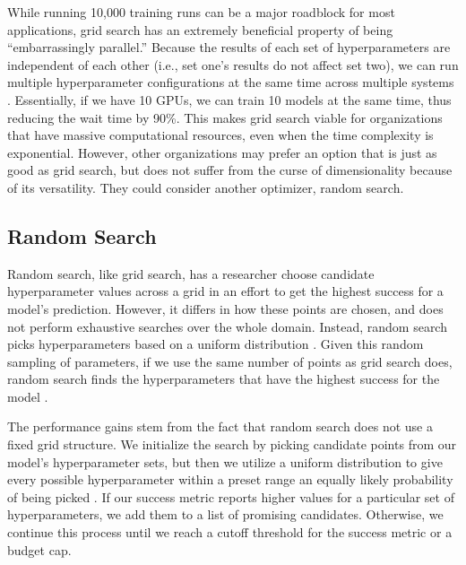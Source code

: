 \documentclass[stu,12pt,floatsintext]{apa7}
\begin{document}
While running 10,000 training runs can be a major roadblock for most applications, grid search has an extremely beneficial property of being ``embarrassingly parallel.'' Because the results of each set of hyperparameters are independent of each other (i.e., set one's results do not affect set two), we can run multiple hyperparameter configurations at the same time across multiple systems \parencite{bergstra2012random}. Essentially, if we have 10 GPUs, we can train 10 models at the same time, thus reducing the wait time by 90\%. This makes grid search viable for organizations that have massive computational resources, even when the time complexity is exponential. However, other organizations may prefer an option that is just as good as grid search, but does not suffer from the curse of dimensionality because of its versatility. They could consider another optimizer, random search. 

\subsection{Random Search}

Random search, like grid search, has a researcher choose candidate hyperparameter values across a grid in an effort to get the highest success for a model's prediction. However, it differs in how these points are chosen, and does not perform exhaustive searches over the whole domain. Instead, random search picks hyperparameters based on a uniform distribution \parencite{pilario2020kernel}. Given this random sampling of parameters, if we use the same number of points as grid search does, random search finds the hyperparameters that have the highest success for the model \parencite{bergstra2012random}.

The performance gains stem from the fact that random search does not use a fixed grid structure. We initialize the search by picking candidate points from our model's hyperparameter sets, but then we utilize a uniform distribution to give every possible hyperparameter within a preset range an equally likely probability of being picked \parencite{zabinsky2009random}. If our success metric reports higher values for a particular set of hyperparameters, we add them to a list of promising candidates. Otherwise, we continue this process until we reach a cutoff threshold for the success metric or a budget cap.
\end{document}
